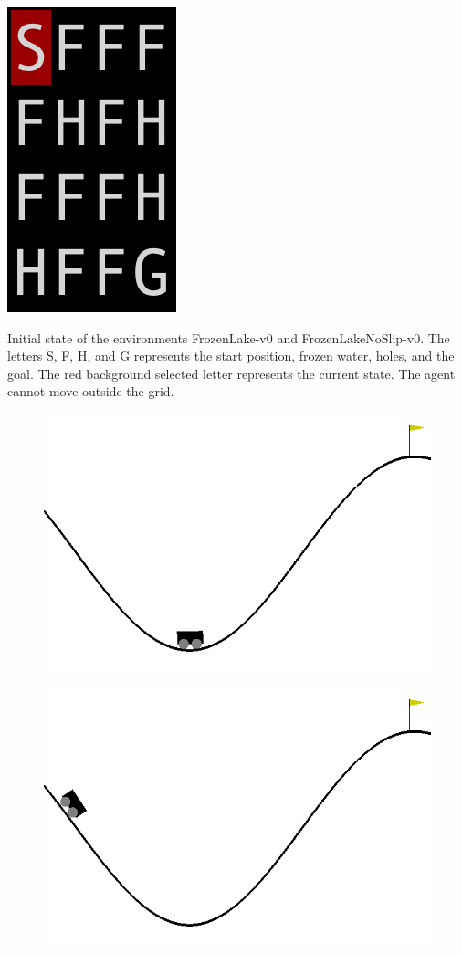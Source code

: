 \documentclass[conference]{IEEEtran}
\begin{document}
\begin{table}[t]
    \centering
    \begin{minipage}{0.5\linewidth}
        \centering
        \includegraphics[width=0.2\linewidth]{img/FrozenLake.png}
        \caption{Initial state of the environments FrozenLake-v0 and FrozenLakeNoSlip-v0. The letters S, F, H, and G represents the start position, frozen water, holes, and the goal. The red background selected letter represents the current state. The agent cannot move outside the grid.}
        \label{FrozenLake initial state}
    \end{minipage}\hfill
    \begin{minipage}{0.45\linewidth}
        \centering
        \begin{subfigure}{0.5\linewidth}
            \centering
            \includegraphics[width=0.9\linewidth]{img/MountainCar-0.png}
            \caption{}
            \label{MountainCar-0 states:a}
        \end{subfigure}%
        \begin{subfigure}{0.5\linewidth}
            \centering
            \includegraphics[width=0.9\linewidth]{img/MountainCar-1.png}

\end{subfigure}
\end{minipage}
\end{table}
\end{document}
